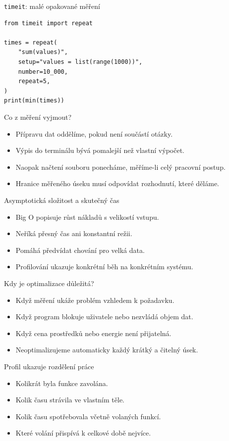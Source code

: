 \documentclass[aspectratio=169]{beamer}
\begin{document}
\begin{frame}[fragile]{\texttt{timeit}: malé opakované měření}
\begin{lstlisting}[style=python]
from timeit import repeat

times = repeat(
    "sum(values)",
    setup="values = list(range(1000))",
    number=10_000,
    repeat=5,
)
print(min(times))
\end{lstlisting}
\end{frame}

\begin{frame}{Co z měření vyjmout?}
\begin{itemize}
\item Přípravu dat oddělíme, pokud není součástí otázky.
\item Výpis do terminálu bývá pomalejší než vlastní výpočet.
\item Naopak načtení souboru ponecháme, měříme-li celý pracovní postup.
\item Hranice měřeného úseku musí odpovídat rozhodnutí, které děláme.
\end{itemize}
\end{frame}

\begin{frame}{Asymptotická složitost a skutečný čas}
\begin{itemize}
\item Big O popisuje růst nákladů s velikostí vstupu.
\item Neříká přesný čas ani konstantní režii.
\item Pomáhá předvídat chování pro velká data.
\item Profilování ukazuje konkrétní běh na konkrétním systému.
\end{itemize}
\end{frame}

\begin{frame}{Kdy je optimalizace důležitá?}
\begin{itemize}
\item Když měření ukáže problém vzhledem k požadavku.
\item Když program blokuje uživatele nebo nezvládá objem dat.
\item Když cena prostředků nebo energie není přijatelná.
\item Neoptimalizujeme automaticky každý krátký a čitelný úsek.
\end{itemize}
\end{frame}

\begin{frame}{Profil ukazuje rozdělení práce}
\begin{itemize}
\item Kolikrát byla funkce zavolána.
\item Kolik času strávila ve vlastním těle.
\item Kolik času spotřebovala včetně volaných funkcí.
\item Které volání přispívá k celkové době nejvíce.
\end{itemize}
\end{frame}
\end{document}
